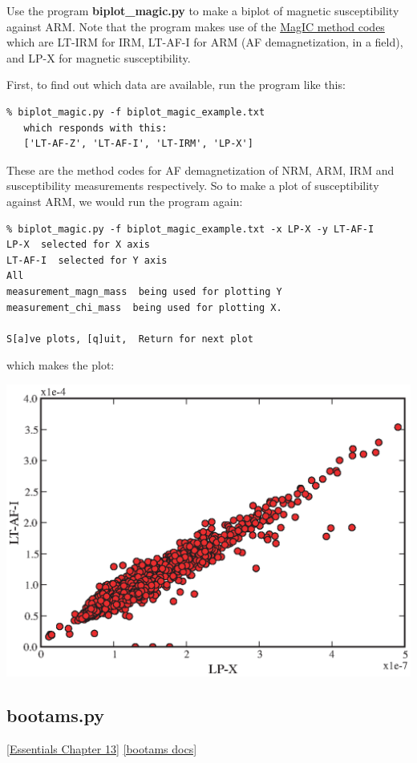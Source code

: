 \documentclass[11pt]{book}
\begin{document}
{{Use the program {\bf biplot\_magic.py} to make a biplot of  magnetic susceptibility against ARM.  Note that the program makes use of the \href{#method_codes}{MagIC method codes} which are LT-IRM for IRM, LT-AF-I for ARM (AF demagnetization, in a field), and LP-X for magnetic susceptibility.

First, to find out which data are available, run the program like this:

\begin{verbatim}
% biplot_magic.py -f biplot_magic_example.txt
   which responds with this:
   ['LT-AF-Z', 'LT-AF-I', 'LT-IRM', 'LP-X']
   \end{verbatim}

These are the method codes for  AF demagnetization of NRM, ARM, IRM and susceptibility measurements respectively.  So to make a plot of
susceptibility against ARM, we would run the program again:


\begin{verbatim}
% biplot_magic.py -f biplot_magic_example.txt -x LP-X -y LT-AF-I
LP-X  selected for X axis
LT-AF-I  selected for Y axis
All
measurement_magn_mass  being used for plotting Y
measurement_chi_mass  being used for plotting X.

S[a]ve plots, [q]uit,  Return for next plot
\end{verbatim}

\noindent which makes the plot:

  \includegraphics[width=15cm]{EPSfiles/arm-x.eps}



\subsection{bootams.py}
\href{http://earthref.org/MAGIC/books/Tauxe/Essentials/WebBook3ch13.html#ch13}{[Essentials Chapter 13]}
\href{https://github.com/PmagPy/PmagPy/blob/master/programs/bootams.py}{[bootams docs]}

}}
\end{document}
